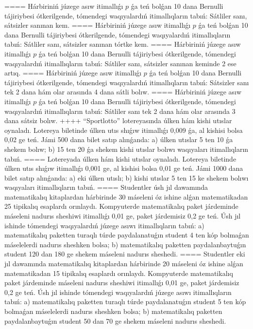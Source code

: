 ====
Hárbiriniń júzege asıw itimallıǵı $p$ ǵa teń bolǵan 10 dana Bernulli tájiriybesi ótkerilgende, tómendegi waqıyalardıń itimallıqların tabıń: Sátliler sanı, sátsizler sanınan kem.
====
Hárbiriniń júzege asıw itimallıǵı $p$ ǵa teń bolǵan 10 dana Bernulli tájiriybesi ótkerilgende, tómendegi waqıyalardıń itimallıqların tabıń: Sátliler sanı, sátsizler sanınan tórtke kem.
====
Hárbiriniń júzege asıw itimallıǵı $p$ ǵa teń bolǵan 10 dana Bernulli tájiriybesi ótkerilgende, tómendegi waqıyalardıń itimallıqların tabıń: Sátliler sanı, sátsizler sanınan keminde 2 ese artıq.
====
Hárbiriniń júzege asıw itimallıǵı $p$ ǵa teń bolǵan 10 dana Bernulli tájiriybesi ótkerilgende, tómendegi waqıyalardıń itimallıqların tabıń: Sátsizler sanı tek 2 dana hám olar arasında 4 dana sátli bolıw.
====
Hárbiriniń júzege asıw itimallıǵı $p$ ǵa teń bolǵan 10 dana Bernulli tájiriybesi ótkerilgende, tómendegi waqıyalardıń itimallıqların tabıń: Sátliler sanı tek 2 dana hám olar arasında 3 dana sátsiz bolıw.
++++
“Sportlotto” lotereyasında úlken hám kishi utıslar oynaladı. Lotereya biletinde úlken utıs shıǵıw itimallıǵı 0,009 ǵa, al kishisi bolsa 0,02 ge teń. Jámi 500 dana bilet satıp alınǵanda: a) úlken utıslar 5 ten 10 ǵa shekem bolıw; b) 15 ten 20 ǵa shekem kishi utıslar bolıwı waqıyaları itimallıqların tabıń.
====
Lotereyada úlken hám kishi utıslar oynaladı. Lotereya biletinde úlken utıs shıǵıw itimallıǵı 0,001 ge, al kishisi bolsa 0,01 ge teń. Jámi 1000 dana bilet satıp alınǵanda: a) eki úlken utıslı; b) kishi utıslar 5 ten 15 ke shekem bolıwı waqıyaları itimallıqların tabıń.
====
Studentler úsh jıl dawamında matematikalıq kitaplardan hárbirinde 30 máseleni óz ishine alǵan matematikadan 25 tipikalıq esaplardı orınlaydı. Kompyuterde matematikalıq paket járdeminde máseleni nadurıs sheshiwi itimallıǵı 0,01 ge, paket járdemisiz 0,2 ge teń. Úsh jıl ishinde tómendegi waqıyalardıń júzege asıwı itimallıqların tabıń: a) matematikalıq paketten turaqlı túrde paydalanatuǵın student 4 ten kóp bolmaǵan máselelerdi nadurıs sheshken bolsa; b) matematikalıq paketten paydalanbaytuǵın student 120 dan 180 ge shekem máseleni nadurıs sheshedi.
====
Studentler eki jıl dawamında matematikalıq kitaplardan hárbirinde 20 máseleni óz ishine alǵan matematikadan 15 tipikalıq esaplardı orınlaydı. Kompyuterde matematikalıq paket járdeminde máseleni nadurıs sheshiwi itimallıǵı 0,01 ge, paket járdemisiz 0,2 ge teń. Úsh jıl ishinde tómendegi waqıyalardıń júzege asıwı itimallıqların tabıń: a) matematikalıq paketten turaqlı túrde paydalanatuǵın student 5 ten kóp bolmaǵan máselelerdi nadurıs sheshken bolsa; b) matematikalıq paketten paydalanbaytuǵın student 50 dan 70 ge shekem máseleni nadurıs sheshedi.
